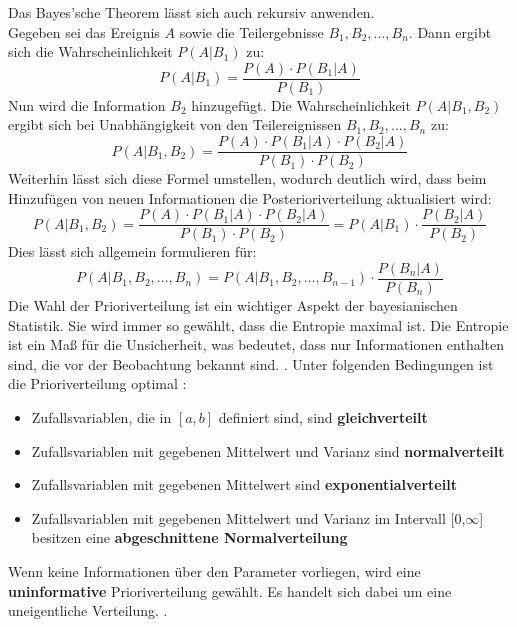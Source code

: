 \documentclass[a4paper,12pt]{article}
\begin{document}
Das Bayes'sche Theorem lässt sich auch rekursiv anwenden. \\
Gegeben sei das Ereignis $A$ sowie die Teilergebnisse $B_1, B_2, ..., B_n$. Dann ergibt sich die Wahrscheinlichkeit $P(A|B_1)$ zu:
\begin{equation}
P(A|B_1) = \frac{P(A) \cdot P(B_1|A)}{P(B_1)}
\end{equation}
Nun wird die Information $B_2$ hinzugefügt. Die Wahrscheinlichkeit $P(A|B_1, B_2)$ ergibt sich bei Unabhängigkeit von den Teilereignissen $B_1, B_2, ..., B_n$ zu:
\begin{equation}
P(A|B_1, B_2) = \frac{P(A) \cdot P(B_1|A) \cdot P(B_2|A)}{P(B_1) \cdot P(B_2)}
\end{equation}
Weiterhin lässt sich diese Formel umstellen, wodurch deutlich wird, dass beim Hinzufügen von neuen Informationen die Posterioriverteilung aktualisiert wird:
\begin{equation}
P(A|B_1, B_2) = \frac{P(A) \cdot P(B_1|A) \cdot P(B_2|A)}{P(B_1) \cdot P(B_2)} = P(A|B_1) \cdot \frac{P(B_2|A)}{P(B_2)}
\end{equation}
Dies lässt sich allgemein formulieren für:
\begin{equation}
P(A|B_1, B_2, ..., B_n) = P(A|B_1, B_2, ..., B_{n-1}) \cdot \frac{P(B_n|A)}{P(B_n)}
\end{equation}
Die Wahl der Prioriverteilung ist ein wichtiger Aspekt der bayesianischen Statistik. Sie wird immer so gewählt, dass die Entropie maximal ist. Die Entropie ist ein Maß für die Unsicherheit, was bedeutet, dass nur Informationen enthalten sind, die vor der Beobachtung bekannt sind. \parencite[57]{EinfBayesStatistik}. Unter folgenden Bedingungen ist die Prioriverteilung optimal \parencite[59]{EinfBayesStatistik}:
\begin{itemize}
  \item Zufallsvariablen, die in $[a,b]$ definiert sind, sind \textbf{gleichverteilt}
  \item Zufallsvariablen mit gegebenen Mittelwert und Varianz sind \textbf{normalverteilt}
  \item Zufallsvariablen mit gegebenen Mittelwert sind \textbf{exponentialverteilt}
  \item Zufallsvariablen mit gegebenen Mittelwert und Varianz im Intervall [0,$\infty$] besitzen eine \textbf{abgeschnittene Normalverteilung}
\end{itemize}
Wenn keine Informationen über den Parameter vorliegen, wird eine \textbf{uninformative} Prioriverteilung gewählt. Es handelt sich dabei um eine uneigentliche Verteilung. \parencite[57]{EinfBayesStatistik}.
\end{document}
